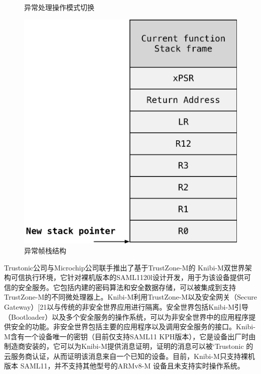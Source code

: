 \documentclass[12pt,a4paper]{ctexart}
\begin{document}
\begin{figure}[htbp]
\begin{minipage}[t]{0.4\textwidth}
        \caption{异常处理操作模式切换}
    \end{minipage}
    \hspace{0.58in} %
    \begin{minipage}[t]{0.4\textwidth}%
        \centering
        \includegraphics[scale=0.25]{graph/4.png}
        \caption{异常帧栈结构}
    \end{minipage}
\end{figure}
\par Trustonic公司与Microchip公司联手推出了基于TrustZone-M的 Knibi-M双世界架构可信执行环境\cite{cowan1998automatic}，它针对裸机版本的SAML1120l设计开发，用于为该设备提供可信的安全服务。它包括内建的密码算法和安全数据存储，可以被集成到支持TrustZone-M的不同微处理器上。Knibi-M利用TrustZone-M以及安全网关（Secure Gateway）[21以与传统的非安全世界应用进行隔离。安全世界包括Knibi-M引导（Bootloader）以及多个安全服务的操作系统，可以为非安全世界中的应用程序提供安全的功能。非安全世界包括主要的应用程序以及调用安全服务的接口。Knibi-M含有一个设备唯一的密钥（目前仅支持SAML11 KPH版本），它是设备出厂时由制造商安装的，它可以为Knibi-M提供消息证明，证明的消息可以被‘Trustonic 的云服务商认证，从而证明该消息来自一个已知的设备。目前，Knibi-M只支持裸机版本 SAML11，并不支持其他型号的ARMv8-M 设备且未支持实时操作系统。
\end{document}
